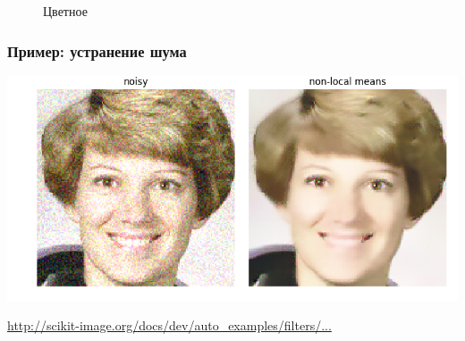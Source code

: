 \documentclass[fleqn, xcolor=x11names]{beamer}
\begin{document}
\begin{frame}[fragile]
\begin{figure}[H]
\begin{minipage}[h]{0.25\linewidth}
		\end{minipage}
		\hfill
		\centering
		\begin{minipage}[h]{0.25\linewidth}
			 Цветное \\
		\end{minipage}
		
		
		\label{fig:image}
	\end{figure}
	
	
\end{frame}

\begin{frame}[fragile]\frametitle{Пример: устранение шума}

\includegraphics[scale=0.5]{images/noize_removal.png}

\href{http://scikit-image.org/docs/dev/auto_examples/filters/plot_nonlocal_means.html#sphx-glr-auto-examples-filters-plot-nonlocal-means-py}{http://scikit-image.org/docs/dev/auto\_examples/filters/...}
\end{frame}
\end{document}
